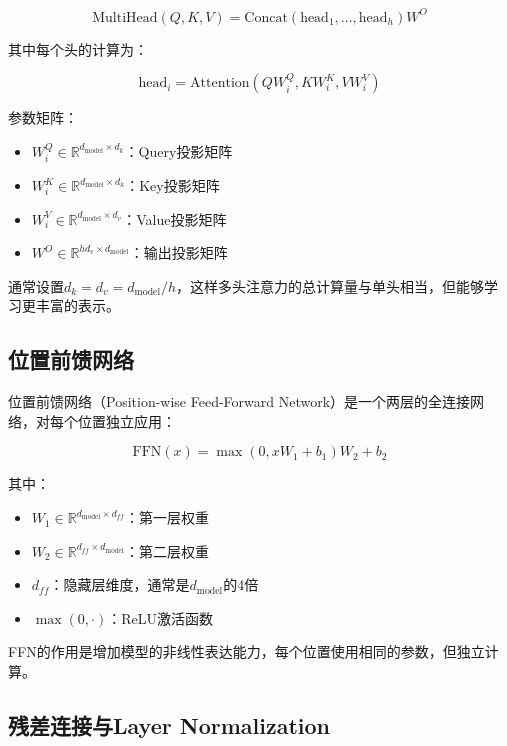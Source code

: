 \documentclass[UTF8,12pt,a4paper]{ctexart}
\begin{document}
\begin{equation}
\text{MultiHead}(Q, K, V) = \text{Concat}(\text{head}_1, ..., \text{head}_h)W^O
\end{equation}

其中每个头的计算为：

\begin{equation}
\text{head}_i = \text{Attention}(QW_i^Q, KW_i^K, VW_i^V)
\end{equation}

参数矩阵：
\begin{itemize}
    \item $W_i^Q \in \mathbb{R}^{d_{\text{model}} \times d_k}$：Query投影矩阵
    \item $W_i^K \in \mathbb{R}^{d_{\text{model}} \times d_k}$：Key投影矩阵
    \item $W_i^V \in \mathbb{R}^{d_{\text{model}} \times d_v}$：Value投影矩阵
    \item $W^O \in \mathbb{R}^{hd_v \times d_{\text{model}}}$：输出投影矩阵
\end{itemize}

通常设置$d_k = d_v = d_{\text{model}} / h$，这样多头注意力的总计算量与单头相当，但能够学习更丰富的表示。

\subsection{位置前馈网络}

位置前馈网络（Position-wise Feed-Forward Network）是一个两层的全连接网络，对每个位置独立应用：

\begin{equation}
\text{FFN}(x) = \max(0, xW_1 + b_1)W_2 + b_2
\end{equation}

其中：
\begin{itemize}
    \item $W_1 \in \mathbb{R}^{d_{\text{model}} \times d_{ff}}$：第一层权重
    \item $W_2 \in \mathbb{R}^{d_{ff} \times d_{\text{model}}}$：第二层权重
    \item $d_{ff}$：隐藏层维度，通常是$d_{\text{model}}$的4倍
    \item $\max(0, \cdot)$：ReLU激活函数
\end{itemize}

FFN的作用是增加模型的非线性表达能力，每个位置使用相同的参数，但独立计算。

\subsection{残差连接与Layer Normalization}
\end{document}
